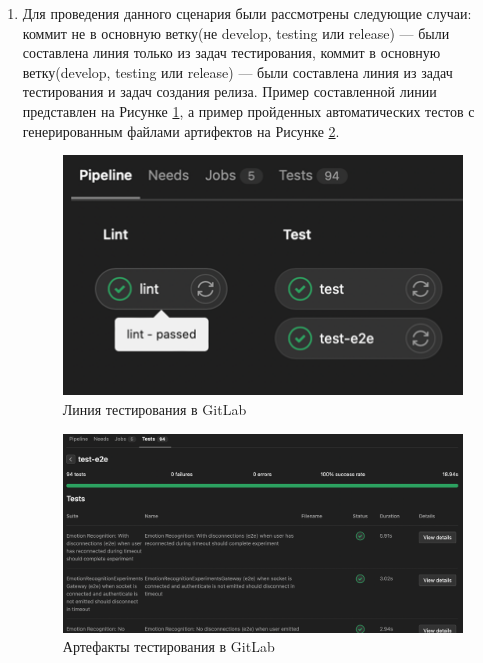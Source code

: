 \begin{enumerate}
    \item Для проведения данного сценария были рассмотрены следующие случаи:
    коммит не в основную ветку(не develop, testing или release) --- были составлена линия только из задач тестирования,
    коммит в основную ветку(develop, testing или release) --- были составлена линия из задач тестирования и задач создания релиза.
    Пример составленной линии представлен на Рисунке \ref{fig:qa-pipeline}, а пример пройденных автоматических тестов
    с генерированным файлами артифектов на Рисунке \ref{fig:qa-artifacts}.

    \begin{figure}[ht]
        \centering
        \includegraphics[scale=0.8]{src/figures/qa-pipeline}
        \caption{Линия тестирования в GitLab}
        \label{fig:qa-pipeline}
    \end{figure}

    \begin{figure}[ht]
        \centering
        \includegraphics[scale=0.4]{src/figures/qa-artifacts}
        \caption{Артефакты тестирования в GitLab}
        \label{fig:qa-artifacts}
    \end{figure}


\end{enumerate}

